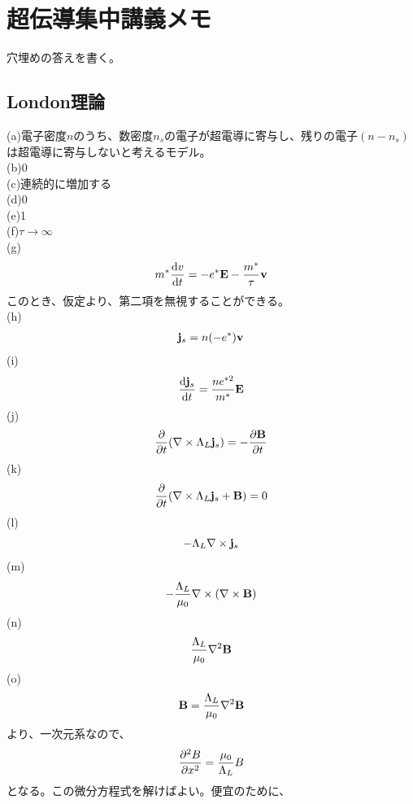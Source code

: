 \documentclass[a4paper,11pt]{jsarticle}
\numberwithin{equation}{section}
\begin{document}
\section{超伝導集中講義メモ}
穴埋めの答えを書く。\\
\subsection{London理論}
\noindent
(a)電子密度$n$のうち、数密度$n_s$の電子が超電導に寄与し、残りの電子$(n-n_s)$は超電導に寄与しないと考えるモデル。\\
(b)$0$\\
(c)連続的に増加する\\
(d)0\\
(e)1\\
(f)$ \tau \to \infty$\\
(g)
\begin{align}
  m^{*} \dv{v}{t} = -{e^{*}}\vb{E} - \frac{m^*}{\tau}\vb{v}
\end{align}
このとき、仮定より、第二項を無視することができる。\\
(h)
\begin{align}
  \vb{j}_s = n(-e^{*})\vb{v}
\end{align}
(i)
\begin{align}
  \dv{\vb{j}_s}{t} = \frac{ne^{*2}}{m^*}\vb{E}
\end{align}
(j)
\begin{align}
  \pdv{t}\qty(\nabla \times \Lambda_{L}\vb{j}_s) = -\pdv{\vb{B}}{t}
\end{align}
(k)
\begin{align}
  \pdv{t}\qty(\nabla \times \Lambda_{L}\vb{j}_s + \vb{B}) = 0
\end{align}
(l)
\begin{align}
  -\Lambda_{L}\nabla \times \vb{j}_s
\end{align}
(m)
\begin{align}
  -\frac{\Lambda_{L}}{\mu_0}\nabla \times (\nabla \times \vb{B})
\end{align}
(n)
\begin{align}
  \frac{\Lambda_{L}}{\mu_0}\nabla^2 \vb{B}
\end{align}
(o)
\begin{align}
  \vb{B} = \frac{\Lambda_{L}}{\mu_0}\nabla^2 \vb{B}
\end{align}
より、一次元系なので、
\begin{align}
  \pdv[2]{B}{x} = \frac{\mu_0}{\Lambda_{L}}B
\end{align}
となる。この微分方程式を解けばよい。便宜のために、
\end{document}
